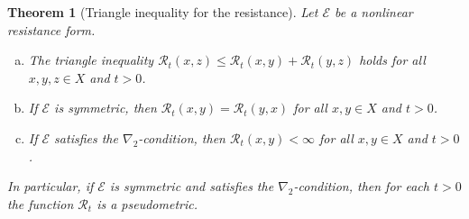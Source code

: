 \documentclass[a4paper,11pt,reqno]{amsart}
\newtheorem{theorem}[lemma]{Theorem}
\theoremstyle{definition}
\numberwithin{equation}{section}
\newcommand{\cR}{{\mathcal R}}
\newcommand{\cE}{{\mathcal E}}
\newcommand{\1}{\mathds{1}}
\begin{document}
 
\begin{theorem}[Triangle inequality for the resistance]\label{theorem:triangle inequality}
Let $\cE$ be a nonlinear resistance form.  
\begin{enumerate}[(a)]
 \item The triangle inequality $\cR_t(x,z) \leq \cR_t(x,y) + \cR_t(y,z)$ holds for all $x,y,z \in X$ and $t > 0$. 
 \item If $\cE$ is symmetric, then  $\cR_t(x,y) = \cR_t(y,x)$ for all $x,y \in X$ and $t > 0$.
 \item If $\cE$ satisfies the $\nabla_2$-condition, then $\cR_t(x,y) < \infty$ for all $x,y \in X$ and $t> 0$.
\end{enumerate}
In particular, if $\cE$ is symmetric and satisfies the $\nabla_2$-condition, then for each $t > 0$ the function $\cR_t$ is a pseudometric. 
\end{theorem}
\end{document}
